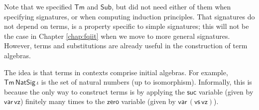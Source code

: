 \documentclass[12pt,a4paper,twoside,openany]{book}
\theoremstyle{remark}
\theoremstyle{definition}
\theoremstyle{theorem}
\newcommand{\ms}[1]{\mathsf{#1}}
\newcommand{\Sub}{\mathsf{Sub}}
\newcommand{\Tm}{\mathsf{Tm}}
\newcommand{\var}{\ms{var}}
\newcommand{\vz}{\ms{vz}}
\newcommand{\vs}{\ms{vs}}
\begin{document}
Note that we specified $\Tm$ and $\Sub$, but did not need either of them when
specifying signatures, or when computing induction principles. That signatures
do not depend on terms, is a property specific to simple signatures; this will
not be the case in Chapter \ref{chap:fqiit} when we move to more general
signatures. However, terms and substitutions are already useful in the
construction of term algebras.

The idea is that terms in contexts comprise initial algebras. For example,
$\Tm\,\ms{NatSig}\,\iota$ is the set of natural numbers (up to
isomorphism). Informally, this is because the only way to construct terms is by
applying the $\ms{suc}$ variable (given by $\var\,\vz$) finitely many times to
the $\ms{zero}$ variable (given by $\var\,(\vs\,\vz)$).

\begingroup
\allowdisplaybreaks
\end{document}
